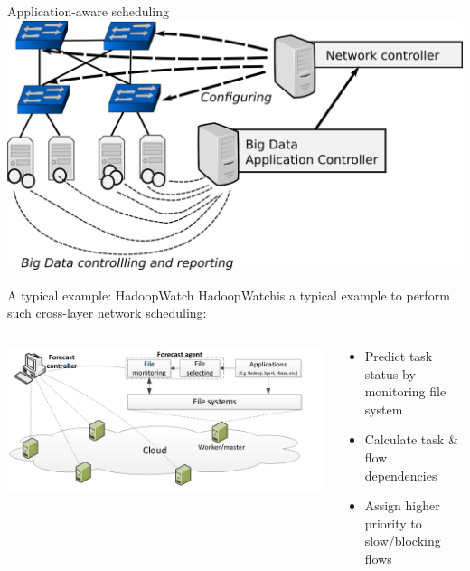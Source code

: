 \documentclass{beamer}
\begin{document}
\begin{frame}{Application-aware scheduling}
\centering
\includegraphics[scale=.15]{application-aware-scheduling.png}\footnotemark

\end{frame}

\begin{frame}{A typical example: HadoopWatch}
HadoopWatch\footnotemark is a typical example to perform such cross-layer network scheduling:

\begin{columns}
    \begin{column}{0.6\linewidth}
        \centering
        \includegraphics[scale=.23]{hadoopwatch.png}
    \end{column}
    \begin{column}{0.4\linewidth}
        \begin{itemize}
            \item Predict task status by monitoring file system
            \item Calculate task \& flow dependencies
            \item Assign higher priority to slow/blocking flows
        \end{itemize}
    \end{column}
\end{columns}
\end{frame}
\end{document}
